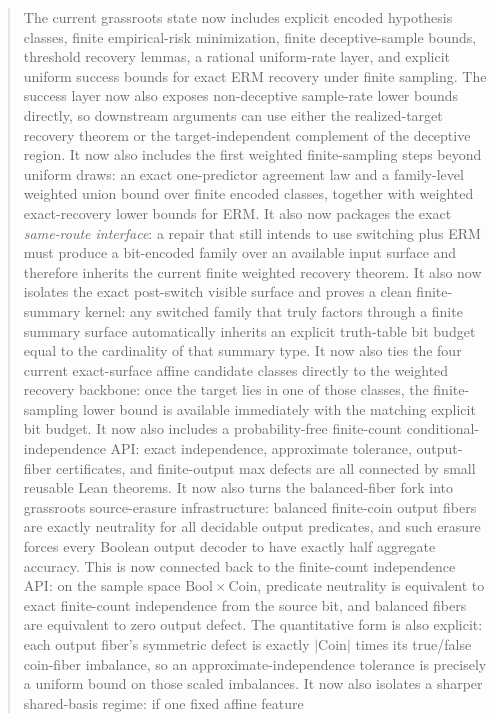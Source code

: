 \documentclass[11pt]{article}
\theoremstyle{remark}
\begin{document}
\begin{abstract}
The current grassroots state now includes explicit encoded hypothesis classes,
finite empirical-risk minimization, finite deceptive-sample bounds, threshold
recovery lemmas, a rational uniform-rate layer, and explicit uniform success
bounds for exact ERM recovery under finite sampling.  The success layer now
also exposes non-deceptive sample-rate lower bounds directly, so downstream
arguments can use either the realized-target recovery theorem or the
target-independent complement of the deceptive region.  It now also includes
the first weighted finite-sampling steps beyond uniform draws: an exact
one-predictor agreement law and a family-level weighted union bound over finite
encoded classes, together with weighted exact-recovery lower bounds for ERM.
It also now packages the exact \emph{same-route interface}: a repair that still
intends to use switching plus ERM must produce a bit-encoded family over an
available input surface and therefore inherits the current finite weighted
recovery theorem.
It also now isolates the exact post-switch visible surface and proves a clean
finite-summary kernel: any switched family that truly factors through a finite
summary surface automatically inherits an explicit truth-table bit budget equal
to the cardinality of that summary type.
It now also ties the four current exact-surface affine candidate classes
directly to the weighted recovery backbone: once the target lies in one of
those classes, the finite-sampling lower bound is available immediately with the
matching explicit bit budget.
It now also includes a probability-free finite-count conditional-independence
API: exact independence, approximate tolerance, output-fiber certificates, and
finite-output max defects are all connected by small reusable Lean theorems.
It now also turns the balanced-fiber fork into grassroots source-erasure
infrastructure: balanced finite-coin output fibers are exactly neutrality for
all decidable output predicates, and such erasure forces every Boolean output
decoder to have exactly half aggregate accuracy.
This is now connected back to the finite-count independence API: on the sample
space \(\mathrm{Bool}\times\mathrm{Coin}\), predicate neutrality is equivalent
to exact finite-count independence from the source bit, and balanced fibers are
equivalent to zero output defect.
The quantitative form is also explicit: each output fiber's symmetric defect is
exactly \(|\mathrm{Coin}|\) times its true/false coin-fiber imbalance, so an
approximate-independence tolerance is precisely a uniform bound on those scaled
imbalances.
It now also isolates a sharper shared-basis regime: if one fixed affine feature

\end{abstract}
\end{document}
